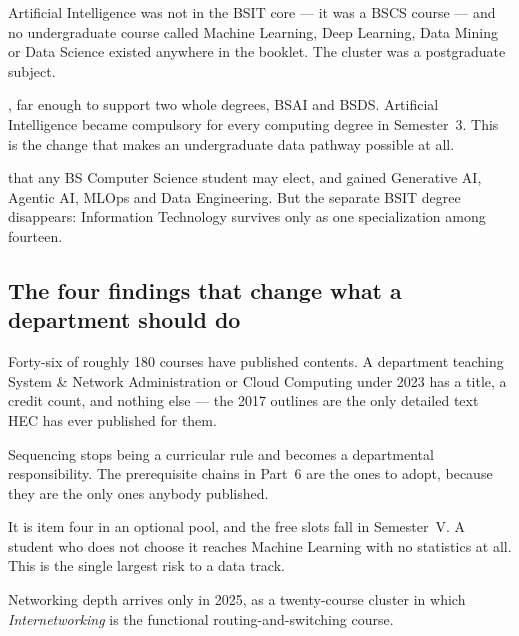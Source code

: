 \documentclass[11pt,a4paper,oneside]{report}
\begin{document}
\begin{tightnum}
  \item {}
        Artificial Intelligence was not in the BSIT core --- it was a BSCS course
        --- and no undergraduate course called Machine Learning, Deep Learning,
        Data Mining or Data Science existed anywhere in the booklet. The cluster
        was a postgraduate subject.
  \item {}, far enough
        to support two whole degrees, BSAI and BSDS. Artificial Intelligence
        became compulsory for every computing degree in Semester~3. This is the
        change that makes an undergraduate data pathway possible at all.
  \item {} that any BS
        Computer Science student may elect, and gained Generative AI, Agentic AI,
        MLOps and Data Engineering. But the separate BSIT degree disappears:
        Information Technology survives only as one specialization among
        fourteen.
\end{tightnum}

\subsection*{The four findings that change what a department should do}

\begin{tightnum}
  \item {} Forty-six of
        roughly 180 courses have published contents. A department teaching System
        \& Network Administration or Cloud Computing under 2023 has a title, a
        credit count, and nothing else --- the 2017 outlines are the only
        detailed text HEC has ever published for them.
  \item {} Sequencing stops being a curricular rule and
        becomes a departmental responsibility. The prerequisite chains in Part~6
        are the ones to adopt, because they are the only ones anybody published.
  \item {} It is
        item four in an optional pool, and the free slots fall in Semester~V. A
        student who does not choose it reaches Machine Learning with no
        statistics at all. This is the single largest risk to a data track.
  \item {} Networking depth arrives only in 2025, as a
        twenty-course cluster in which \emph{Internetworking} is the functional
        routing-and-switching course.
\end{tightnum}
\end{document}
